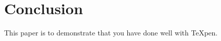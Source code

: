 \documentclass[11pt,a4paper]{article} %
\begin{document}
\section{Conclusion}
This paper is to demonstrate that you have done well with {\TeX}pen.




\clearpage

%
\end{document}
